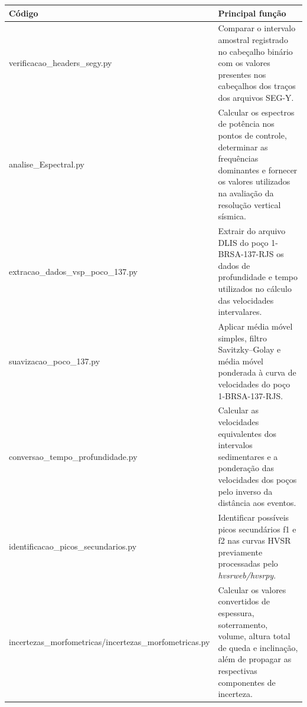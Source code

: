 \begin{quadro}
  \centering
  \caption[Códigos disponibilizados no repositório e suas principais funções]{Códigos disponibilizados no repositório e suas principais funções.}
  \label{qua:resultado-A-1}
  \small
  \setlength{\tabcolsep}{2.5pt}
  \begin{tabularx}{\textwidth}{|>{\raggedright\arraybackslash}p{}|>{\raggedright\arraybackslash}X|}
    \hline
    \textbf{\textbf{Código}} & \textbf{\textbf{Principal função}} \\
    \hline
    verificacao\_\allowbreak{}headers\_\allowbreak{}segy.py & Comparar o intervalo amostral registrado no cabeçalho binário com os valores presentes nos cabeçalhos dos traços dos arquivos SEG-Y. \\
    \hline
    analise\_\allowbreak{}Espectral.py & Calcular os espectros de potência nos pontos de controle, determinar as frequências dominantes e fornecer os valores utilizados na avaliação da resolução vertical sísmica. \\
    \hline
    extracao\_\allowbreak{}dados\_\allowbreak{}vsp\_\allowbreak{}poco\_\allowbreak{}137.py & Extrair do arquivo DLIS do poço 1-BRSA-137-RJS os dados de profundidade e tempo utilizados no cálculo das velocidades intervalares. \\
    \hline
    suavizacao\_\allowbreak{}poco\_\allowbreak{}137.py & Aplicar média móvel simples, filtro Savitzky--Golay e média móvel ponderada à curva de velocidades do poço 1-BRSA-137-RJS. \\
    \hline
    conversao\_\allowbreak{}tempo\_\allowbreak{}profundidade.py & Calcular as velocidades equivalentes dos intervalos sedimentares e a ponderação das velocidades dos poços pelo inverso da distância aos eventos. \\
    \hline
    identificacao\_\allowbreak{}picos\_\allowbreak{}secundarios.py & Identificar possíveis picos secundários f1 e f2 nas curvas HVSR previamente processadas pelo \textit{hvsrweb/hvsrpy}. \\
    \hline
    incertezas\_\allowbreak{}morfometricas/incertezas\_\allowbreak{}morfometricas.py & Calcular os valores convertidos de espessura, soterramento, volume, altura total de queda e inclinação, além de propagar as respectivas componentes de incerteza. \\
    \hline
  \end{tabularx}
\end{quadro}
